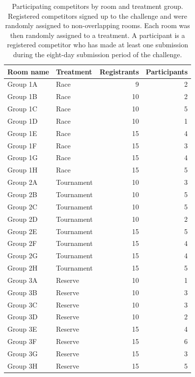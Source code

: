 \documentclass[]{article}
\theoremstyle{plain} %
\begin{document}
\begin{table}[ht]
\centering
\begin{tabular}{llrr}
  \hline
Room name & Treatment & Registrants & Participants \\ 
  \hline
Group 1A & Race &   9 &   2 \\ 
  Group 1B & Race &  10 &   2 \\ 
  Group 1C & Race &  10 &   5 \\ 
  Group 1D & Race &  10 &   1 \\ 
  Group 1E & Race &  15 &   4 \\ 
  Group 1F & Race &  15 &   3 \\ 
  Group 1G & Race &  15 &   4 \\ 
  Group 1H & Race &  15 &   5 \\ 
  Group 2A & Tournament &  10 &   3 \\ 
  Group 2B & Tournament &  10 &   5 \\ 
  Group 2C & Tournament &  10 &   5 \\ 
  Group 2D & Tournament &  10 &   2 \\ 
  Group 2E & Tournament &  15 &   5 \\ 
  Group 2F & Tournament &  15 &   4 \\ 
  Group 2G & Tournament &  15 &   4 \\ 
  Group 2H & Tournament &  15 &   5 \\ 
  Group 3A & Reserve &  10 &   1 \\ 
  Group 3B & Reserve &  10 &   3 \\ 
  Group 3C & Reserve &  10 &   3 \\ 
  Group 3D & Reserve &  10 &   2 \\ 
  Group 3E & Reserve &  15 &   4 \\ 
  Group 3F & Reserve &  15 &   6 \\ 
  Group 3G & Reserve &  15 &   3 \\ 
  Group 3H & Reserve &  15 &   5 \\ 
   \hline
\end{tabular}
\caption{Participating competitors by room and treatment group. Registered competitors signed up to the challenge and were randomly assigned to non-overlapping rooms. Each room was then randomly assigned to a treatment. A participant is a registered competitor who has made at least one submission during the eight-day submission period of the challenge.} 
\label{tab: results}
\end{table}
\end{document}
